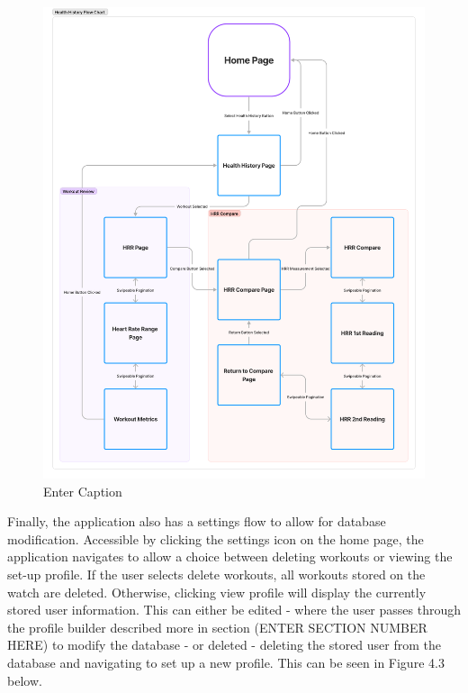 \documentclass{l4proj}
\begin{document}
\begin{figure}[h!]
    \centering
    \includegraphics[width=0.75\linewidth]{dissertation//dissImages/HealthHistoryFlow.pdf}
    \caption{Enter Caption}
    \label{fig:enter-label}
\end{figure}

Finally, the application also has a settings flow to allow for database modification. Accessible by clicking the settings icon on the home page, the application navigates to allow a choice between deleting workouts or viewing the set-up profile. If the user selects delete workouts, all workouts stored on the watch are deleted. Otherwise, clicking view profile will display the currently stored user information. This can either be edited - where the user passes through the profile builder described more in section (ENTER SECTION NUMBER HERE) to modify the database - or deleted - deleting the stored user from the database and navigating to set up a new profile. This can be seen in Figure 4.3 below.
\end{document}
